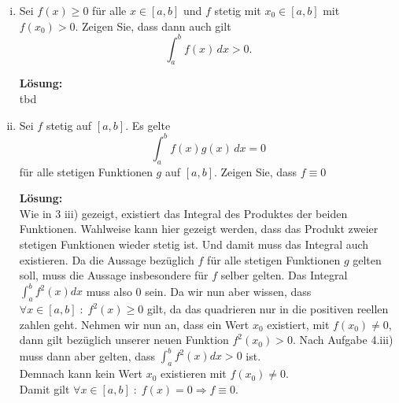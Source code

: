 \documentclass[11pt,a4paper,ngerman]{article}
\begin{document}
\begin{enumerate}[i)]
    \item Sei $f(x) \geq 0$ für alle $x \in [a,b]$ und $f$ stetig mit $x_0 \in [a,b]$ mit $f(x_0) > 0$. Zeigen Sie, dass dann auch gilt
$$
    \int_{a}^{b} f(x) \, dx > 0.
$$

\textbf{Lösung:}\\

tbd

    \item Sei $f$ stetig auf $[a,b]$. Es gelte
$$
\int_{a}^{b} f(x)g(x) \, dx = 0
$$
für alle stetigen Funktionen $g$ auf $[a,b]$. Zeigen Sie, dass $f\equiv 0$

\textbf{Lösung:}\\
Wie in 3 iii) gezeigt, existiert das Integral des Produktes der beiden Funktionen. Wahlweise kann hier gezeigt werden, dass das Produkt zweier stetigen Funktionen wieder stetig ist. Und damit muss das Integral auch existieren.
Da die Aussage bezüglich $f$ für alle stetigen Funktionen $g$ gelten soll, muss die Aussage insbesondere für $f$ selber gelten. Das Integral $\int_a^b f^2 (x) dx$ muss also 0 sein. Da wir nun aber wissen, dass $\forall x \in [a,b] \; : \; f^2(x) \geq 0$ gilt, da das quadrieren nur in die positiven reellen zahlen geht. Nehmen wir nun an, dass ein Wert $x_0$ existiert, mit $f(x_0) \not=0$, dann gilt bezüglich unserer neuen Funktion $f^2(x_0) > 0$. Nach Aufgabe 4.iii) muss dann aber gelten, dass $\int_a^b f^2(x) dx > 0$ ist.\\

Demnach kann kein Wert $x_0$ existieren mit $f(x_0) \not= 0$.\\ Damit gilt $\forall x \in [a,b] \; : \; f(x) = 0 \Rightarrow f \equiv 0$.


\end{enumerate}
\label{LastPage}
\end{document}
